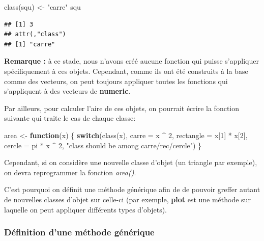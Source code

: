 \documentclass[
]{book}
\newenvironment{Shaded}{\begin{snugshade}}{\end{snugshade}}
\newcommand{\AttributeTok}[1]{\textcolor[rgb]{0.77,0.63,0.00}{#1}}
\newcommand{\ControlFlowTok}[1]{\textcolor[rgb]{0.13,0.29,0.53}{\textbf{#1}}}
\newcommand{\DecValTok}[1]{\textcolor[rgb]{0.00,0.00,0.81}{#1}}
\newcommand{\FunctionTok}[1]{\textcolor[rgb]{0.00,0.00,0.00}{#1}}
\newcommand{\NormalTok}[1]{#1}
\newcommand{\OtherTok}[1]{\textcolor[rgb]{0.56,0.35,0.01}{#1}}
\newcommand{\SpecialCharTok}[1]{\textcolor[rgb]{0.00,0.00,0.00}{#1}}
\newcommand{\StringTok}[1]{\textcolor[rgb]{0.31,0.60,0.02}{#1}}
\theoremstyle{definition}
\theoremstyle{definition}
\theoremstyle{definition}
\theoremstyle{definition}
\theoremstyle{remark}
\begin{document}
\begin{Shaded}
\begin{Highlighting}[]
\FunctionTok{class}\NormalTok{(squ) }\OtherTok{\textless{}{-}} \StringTok{"carre"} 
\NormalTok{squ}
\end{Highlighting}
\end{Shaded}

\begin{verbatim}
## [1] 3
## attr(,"class")
## [1] "carre"
\end{verbatim}

\textbf{Remarque :} à ce stade, nous n'avons créé aucune fonction qui puisse s'appliquer spécifiquement à ces objets. Cependant, comme ils ont été construits à la base comme des vecteurs, on peut toujours appliquer toutes les fonctions qui s'appliquent à des vecteurs de \textbf{numeric}.

Par ailleurs, pour calculer l'aire de ces objets, on pourrait écrire la fonction suivante qui traite le cas de chaque classe:

\begin{Shaded}
\begin{Highlighting}[]
\NormalTok{area }\OtherTok{\textless{}{-}} \ControlFlowTok{function}\NormalTok{(x) \{}
   \ControlFlowTok{switch}\NormalTok{(}\FunctionTok{class}\NormalTok{(x), }
      \AttributeTok{carre =}\NormalTok{ x }\SpecialCharTok{\^{}} \DecValTok{2}\NormalTok{,}
      \AttributeTok{rectangle =}\NormalTok{ x[}\DecValTok{1}\NormalTok{] }\SpecialCharTok{*}\NormalTok{ x[}\DecValTok{2}\NormalTok{],}
      \AttributeTok{cercle =}\NormalTok{ pi }\SpecialCharTok{*}\NormalTok{ x }\SpecialCharTok{\^{}} \DecValTok{2}\NormalTok{,}
      \StringTok{"class should be among carre/rec/cercle"}\NormalTok{)}
\NormalTok{\}}
\end{Highlighting}
\end{Shaded}

Cependant, si on considère une nouvelle classe d'objet (un triangle par exemple), on devra reprogrammer la fonction \emph{area()}.

C'est pourquoi on définit une méthode générique afin de de pouvoir greffer autant de nouvelles classes d'objet sur celle-ci (par exemple, \textbf{plot} est une méthode sur laquelle on peut appliquer différents types d'objets).

\hypertarget{duxe9finition-dune-muxe9thode-guxe9nuxe9rique}{%
\subsubsection{Définition d'une méthode générique}\label{duxe9finition-dune-muxe9thode-guxe9nuxe9rique}}
\end{document}
